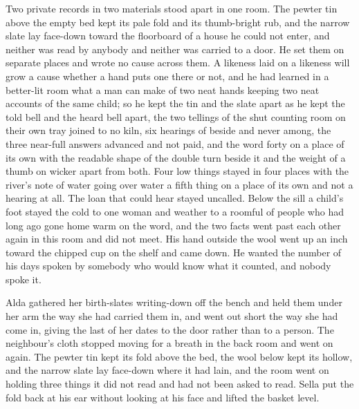 Two private records in two materials stood apart in one room. The pewter tin above the empty bed kept its pale fold and its thumb-bright rub, and the narrow slate lay face-down toward the floorboard of a house he could not enter, and neither was read by anybody and neither was carried to a door. He set them on separate places and wrote no cause across them. A likeness laid on a likeness will grow a cause whether a hand puts one there or not, and he had learned in a better-lit room what a man can make of two neat hands keeping two neat accounts of the same child; so he kept the tin and the slate apart as he kept the told bell and the heard bell apart, the two tellings of the shut counting room on their own tray joined to no kiln, six hearings of  beside and never among, the three near-full answers advanced and not paid, and the word forty on a place of its own with the readable shape of the double turn beside it and the weight of a thumb on wicker apart from both. Four low things stayed in four places with the river's note of water going over water a fifth thing on a place of its own and not a hearing at all. The loan that could hear stayed uncalled. Below the sill a child's foot stayed the cold to one woman and weather to a roomful of people who had long ago gone home warm on the word, and the two facts went past each other again in this room and did not meet. His hand outside the wool went up an inch toward the chipped cup on the shelf and came down. He wanted the number of his days spoken by somebody who would know what it counted, and nobody spoke it.

\scenebreak

Alda gathered her birth-slates writing-down off the bench and held them under her arm the way she had carried them in, and went out short the way she had come in, giving the last of her dates to the door rather than to a person. The neighbour's cloth stopped moving for a breath in the back room and went on again. The pewter tin kept its fold above the bed, the wool below kept its hollow, and the narrow slate lay face-down where it had lain, and the room went on holding three things it did not read and had not been asked to read. Sella put the fold back at his ear without looking at his face and lifted the basket level.

